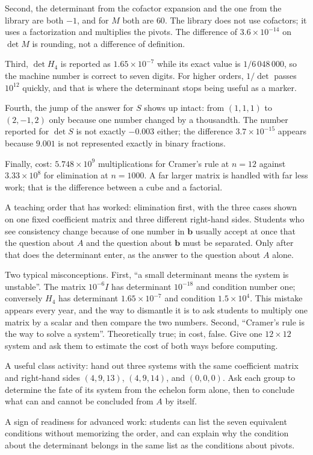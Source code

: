 Second, the determinant from the cofactor expansion and the one from the library are both $-1$,
and for $M$ both are $60$. The library does not use cofactors; it uses a factorization and
multiplies the pivots. The difference of $3.6\times10^{-14}$ on $\det M$ is rounding, not a
difference of definition.

Third, $\det H_{4}$ is reported as $1.65\times10^{-7}$ while its exact value is
$1/6\,048\,000$, so the machine number is correct to seven digits. For higher orders, $1/\det$
passes $10^{12}$ quickly, and that is where the determinant stops being useful as a marker.

Fourth, the jump of the answer for $S$ shows up intact: from $(1,1,1)$ to $(2,-1,2)$ only
because one number changed by a thousandth. The number reported for $\det S$ is not exactly
$-0.003$ either; the difference $3.7\times10^{-15}$ appears because $9.001$ is not
represented exactly in binary fractions.

Finally, cost: $5.748\times10^{9}$ multiplications for Cramer's rule at $n=12$ against
$3.33\times10^{8}$ for elimination at $n=1000$. A far larger matrix is handled with far less
work; that is the difference between a cube and a factorial.

\begin{untukdosen}
A teaching order that has worked: elimination first, with the three cases shown on one fixed
coefficient matrix and three different right-hand sides. Students who see consistency change
because of one number in $\mathbf{b}$ usually accept at once that the question about $A$ and the
question about $\mathbf{b}$ must be separated. Only after that does the determinant enter, as the
answer to the question about $A$ alone.

Two typical misconceptions. First, ``a small determinant means the system is unstable''. The
matrix $10^{-6}I$ has determinant $10^{-18}$ and condition number one; conversely $H_{4}$ has
determinant $1.65\times10^{-7}$ and condition $1.5\times10^{4}$. This mistake appears every
year, and the way to dismantle it is to ask students to multiply one matrix by a scalar and then
compare the two numbers. Second, ``Cramer's rule is the way to solve a system''. Theoretically
true; in cost, false. Give one $12\times12$ system and ask them to estimate the cost of both
ways before computing.

A useful class activity: hand out three systems with the same coefficient matrix and right-hand
sides $(4,9,13)$, $(4,9,14)$, and $(0,0,0)$. Ask each group to determine the fate of its system
from the echelon form alone, then to conclude what can and cannot be concluded from $A$ by
itself.

A sign of readiness for advanced work: students can list the seven equivalent conditions
without memorizing the order, and can explain why the condition about the determinant belongs in
the same list as the conditions about pivots.
\end{untukdosen}

